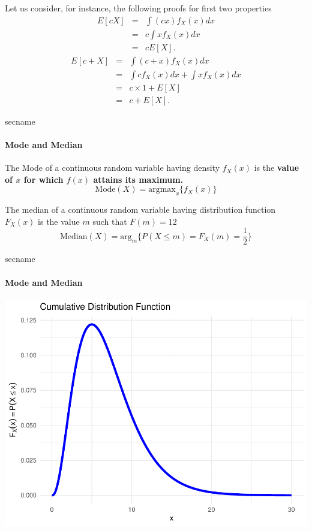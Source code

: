 \documentclass[notes=show,smaller,handout]{beamer}\usepackage[]{graphicx}\usepackage[]{color}
\newenvironment{knitrout}{}{} %
\begin{document}
\begin{frame}{\secname}


Let us consider, for instance, the following proofs for first two properties%
\begin{eqnarray*}
E\left[ cX\right] &=&\int \left( cx\right) f_{X}\left( x\right) dx \\
&=&c\int xf_{X}\left( x\right) dx \\
&=&cE\left[ X\right].
\end{eqnarray*}%
\begin{eqnarray*}
E\left[ c+X\right] &=&\int \left( c+x\right) f_{X}\left( x\right) dx \\
&=&\int cf_{X}\left( x\right) dx+\int xf_{X}\left( x\right) dx \\
&=&c\times 1+E\left[ X\right] \\
&=&c+E\left[ X\right].
\end{eqnarray*}


\end{frame}


\begin{frame}{secname}
\framesubtitle{Mode and Median}
  \begin{definition}[Mode]
    The Mode of a continuous random variable having
    density $f_{X}(x)$ is the \textbf{value of $x$ for which $f(x)$ attains its maximum.}
    $$\text{Mode}(X) = \text{argmax}_{x}\{f_X(x)\}$$
  \end{definition}

  \begin{definition}[Median]
  The median of a continuous random variable having
  distribution function $F_{X}(x)$ is the value $m$ such that $F(m) = 12$
  $$\text{Median}(X) = \text{arg}_{m}\{P(X\leq m) = F_X(m) = \frac{1}{2}\}$$
  \end{definition}
\end{frame}

\begin{frame}{secname}
\framesubtitle{Mode and Median}
\begin{knitrout}
\color{fgcolor}

{\centering \includegraphics[width=0.5\linewidth]{figure/unnamed-chunk-8-1} 

}



\end{knitrout}
\end{frame}
\end{document}
